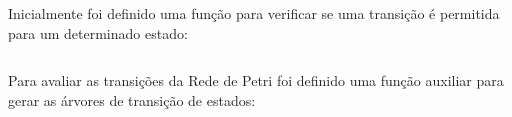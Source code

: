 \documentclass[a4paper,11pt]{article}
\begin{document}
Inicialmente foi definido uma função para verificar se uma transição é permitida para um determinado estado:

\inputminted[xleftmargin=15pt,linenos,frame=single,framesep=5pt,breaklines=true]{matlab}{../matlab/petristate.m}

Para avaliar as transições da Rede de Petri foi definido uma função auxiliar para gerar as árvores de transição de estados:

\inputminted[xleftmargin=15pt,linenos,frame=single,framesep=5pt,breaklines=true]{matlab}{../matlab/dotpetree.m}

\end{document}

